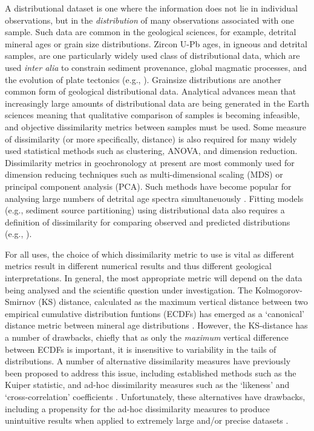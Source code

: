 \documentclass[gchron, manuscript]{copernicus}
\begin{document}
A distributional dataset is one where the information does not lie in individual observations, but in the \textit{distribution} of many observations associated with one sample. Such data are common in the geological sciences, for example, detrital mineral ages or grain size distributions. Zircon U-Pb ages, in igneous and detrital samples, are one particularly widely used class of distributional data, which are used \textit{inter alia} to constrain sediment provenance, global magmatic processes, and the evolution of plate tectonics (e.g., \citealt{condie_granitoid_2009,cawood_detrital_2012,reimink_global_2021}). Grainsize distributions are another common form of geological distributional data. Analytical advances mean that increasingly large amounts of distributional data are being generated in the Earth sciences meaning that qualitative comparison of samples is becoming infeasible, and objective dissimilarity metrics between samples must be used. Some measure of dissimilarity (or more specifically, distance) is also required for many widely used statistical methods such as clustering, ANOVA, and dimension reduction. Dissimilarity metrics in geochronology at present are most commonly used for dimension reducing techniques such as multi-dimensional scaling (MDS) or principal component analysis (PCA). Such methods have become popular for analysing large numbers of detrital age spectra simultaneuously \citep{vermeesch_multi-sample_2013,sharman_detritalpy_2018,vermeesch_dissimilarity_2018}. Fitting models (e.g., sediment source partitioning) using distributional data also requires a definition of dissimilarity for comparing observed and predicted distributions (e.g., \citealt{amidon_construction_2005,de_doncker_inversion_2020}). 

For all uses, the choice of which dissimilarity metric to use is vital as different metrics result in different numerical results and thus different geological interpretations. In general, the most appropriate metric will depend on the data being analysed and the scientific question under investigation. The Kolmogorov-Smirnov (KS) distance, calculated as the maximum vertical distance between two empirical cumulative distribution funtions (ECDFs) has emerged as a `canonical' distance metric between mineral age distributions \citep{berry_north_2001,vermeesch_dissimilarity_2018}. However, the KS-distance has a number of drawbacks, chiefly that as only the \textit{maximum} vertical difference between ECDFs is important, it is insensitive to variability in the tails of distributions. A number of alternative dissimilarity measures have previously been proposed to address this issue, including established methods such as the Kuiper statistic, and ad-hoc dissimilarity measures such as the `likeness' and `cross-correlation' coefficients \citep{satkoski_likeness_2013,saylor_discriminating_2012}. Unfortunately, these alternatives have drawbacks, including a propensity for the ad-hoc dissimilarity measures to produce unintuitive results when applied to extremely large and/or precise datasets \citep{vermeesch_dissimilarity_2018}.
\end{document}

